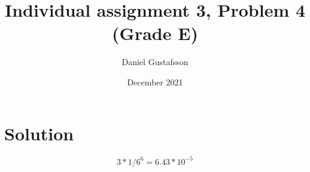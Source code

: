 \documentclass[11pt, a4paper]{article}
\title{Individual assignment 3, Problem 4 (Grade E)}
\author{Daniel Gustafsson}
\date{December 2021}
\begin{document}
\maketitle

\section{Solution}

\[3 * 1/6^6 = 6.43 * 10^{-5} \]
\end{document}

